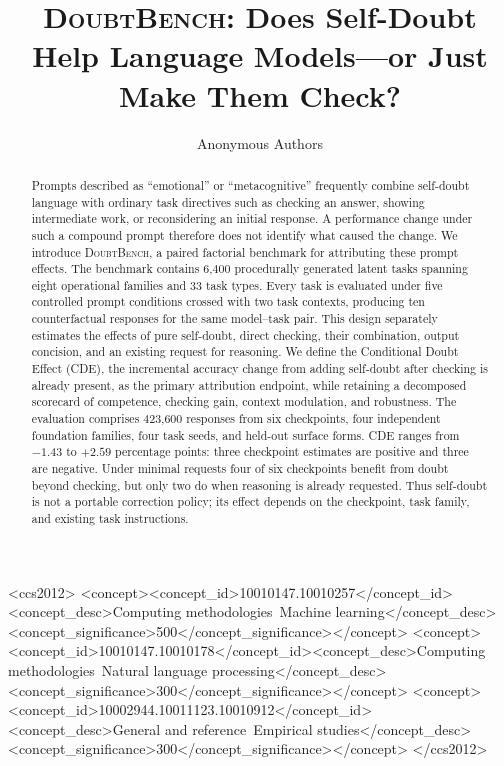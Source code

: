 \documentclass[sigconf]{acmart}
\newcommand{\bench}{\textsc{DoubtBench}}
\newcommand{\revision}[1]{\textcolor{revisionred}{#1}}
\begin{document}
\title{\bench: Does Self-Doubt Help Language Models---or Just Make Them Check?}

\author{Anonymous Authors}
\renewcommand{\shortauthors}{Anonymous Authors}

\begin{abstract}
Prompts described as ``emotional'' or ``metacognitive'' frequently combine
self-doubt language with ordinary task directives such as checking an answer,
showing intermediate work, or reconsidering an initial response. A performance
change under such a compound prompt therefore does not identify what caused
the change. We introduce \bench, a paired factorial benchmark for attributing
these prompt effects. The benchmark contains 6,400 procedurally generated
latent tasks spanning eight operational families and 33 task types. Every task
is evaluated under five controlled prompt conditions crossed with two task
contexts, producing ten counterfactual responses for the same model--task
pair. This design separately estimates the effects of pure self-doubt, direct
checking, their combination, output concision, and an existing request for
reasoning. We define the Conditional Doubt Effect (CDE), the incremental
accuracy change from adding self-doubt after checking is already present, as
the primary attribution endpoint, while retaining a decomposed scorecard of
competence, checking gain, context modulation, and robustness. The evaluation
\revision{comprises 423,600 responses from six checkpoints,
four independent foundation families, four task seeds, and held-out surface
forms. CDE ranges from $-1.43$ to $+2.59$ percentage points: three checkpoint
estimates are positive and three are negative. Under minimal requests four of
six checkpoints benefit from doubt beyond checking, but only two do when
reasoning is already requested. Thus self-doubt is not a portable correction
policy; its effect depends on the checkpoint, task family, and existing task
instructions.}
\end{abstract}

\begin{CCSXML}
<ccs2012>
 <concept><concept_id>10010147.10010257</concept_id><concept_desc>Computing methodologies~Machine learning</concept_desc><concept_significance>500</concept_significance></concept>
 <concept><concept_id>10010147.10010178</concept_id><concept_desc>Computing methodologies~Natural language processing</concept_desc><concept_significance>300</concept_significance></concept>
 <concept><concept_id>10002944.10011123.10010912</concept_id><concept_desc>General and reference~Empirical studies</concept_desc><concept_significance>300</concept_significance></concept>
</ccs2012>
\end{CCSXML}
\end{document}
